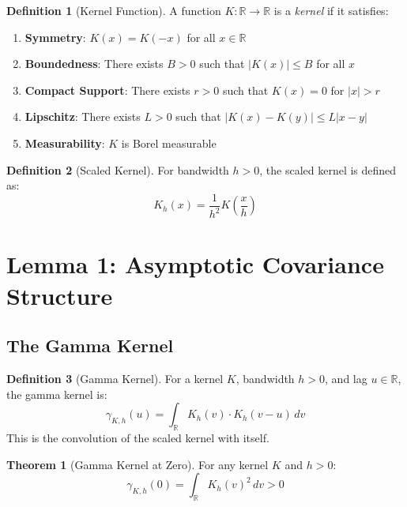 \documentclass[11pt,a4paper]{article}
\theoremstyle{definition}
\newtheorem{definition}{Definition}[section]
\newtheorem{theorem}{Theorem}[section]
\begin{document}
\begin{definition}[Kernel Function]
A function $K: \mathbb{R} \to \mathbb{R}$ is a \emph{kernel} if it satisfies:
\begin{enumerate}
    \item \textbf{Symmetry}: $K(x) = K(-x)$ for all $x \in \mathbb{R}$
    \item \textbf{Boundedness}: There exists $B > 0$ such that $|K(x)| \leq B$ for all $x$
    \item \textbf{Compact Support}: There exists $r > 0$ such that $K(x) = 0$ for $|x| > r$
    \item \textbf{Lipschitz}: There exists $L > 0$ such that $|K(x) - K(y)| \leq L|x - y|$
    \item \textbf{Measurability}: $K$ is Borel measurable
\end{enumerate}
\end{definition}

\begin{definition}[Scaled Kernel]
For bandwidth $h > 0$, the scaled kernel is defined as:
\begin{equation}
K_h(x) = \frac{1}{h^2} K\left(\frac{x}{h}\right)
\end{equation}
\end{definition}

\section{Lemma 1: Asymptotic Covariance Structure}

\subsection{The Gamma Kernel}

\begin{definition}[Gamma Kernel]
For a kernel $K$, bandwidth $h > 0$, and lag $u \in \mathbb{R}$, the gamma kernel is:
\begin{equation}
\gamma_{K,h}(u) = \int_{\mathbb{R}} K_h(v) \cdot K_h(v - u) \, dv
\end{equation}
This is the convolution of the scaled kernel with itself.
\end{definition}

\begin{theorem}[Gamma Kernel at Zero]
For any kernel $K$ and $h > 0$:
\begin{equation}
\gamma_{K,h}(0) = \int_{\mathbb{R}} K_h(v)^2 \, dv > 0
\end{equation}
\end{theorem}
\end{document}
